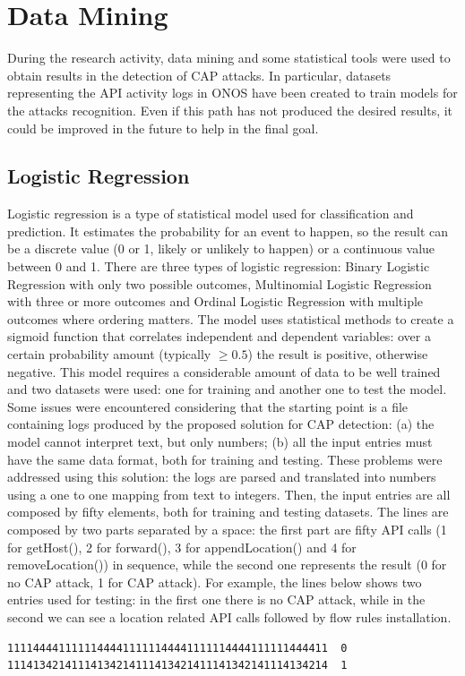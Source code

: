 \clearpage

\section{Data Mining}

During the research activity, data mining and some statistical tools were used to obtain results in the detection of CAP attacks. In particular, datasets representing the API activity logs in ONOS have been created to train models for the attacks recognition. Even if this path has not produced the desired results, it could be improved in the future to help in the final goal.

\subsection{Logistic Regression}
Logistic regression is a type of statistical model used for classification and prediction. It estimates the probability for an event to happen, so the result can be a discrete value (0 or 1, likely or unlikely to happen) or a continuous value between 0 and 1. There are three types of logistic regression: Binary Logistic Regression with only two possible outcomes, Multinomial Logistic Regression with three or more outcomes and Ordinal Logistic Regression with multiple outcomes where ordering matters. The model uses statistical methods to create a sigmoid function that correlates independent and dependent variables: over a certain probability amount (typically $\geq0.5$) the result is positive, otherwise negative. This model requires a considerable amount of data to be well trained and two datasets were used: one for training and another one to test the model. Some issues were encountered considering that the starting point is a file containing logs produced by the proposed solution for CAP detection: (a) the model cannot interpret text, but only numbers; (b) all the input entries must have the same data format, both for training and testing. These problems were addressed using this solution: the logs are parsed and translated into numbers using a one to one mapping from text to integers. Then, the input entries are all composed by fifty elements, both for training and testing datasets. The lines are composed by two parts separated by a space: the first part are fifty API calls (1 for getHost(), 2 for forward(), 3 for appendLocation() and 4 for removeLocation()) in sequence, while the second one represents the result (0 for no CAP attack, 1 for CAP attack). For example, the lines below shows two entries used for testing: in the first one there is no CAP attack, while in the second we can see a location related API calls followed by flow rules installation.
\begin{lstlisting}[language=bash]
11114444111111444411111144441111114444111111444411	0
11141342141114134214111413421411141342141114134214	1
\end{lstlisting}


